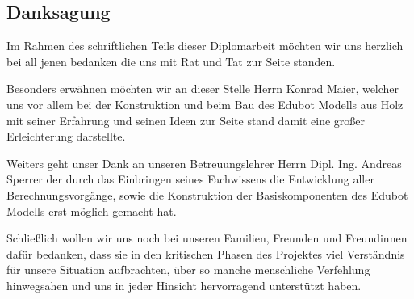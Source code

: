 \subsection{Danksagung}
Im Rahmen des schriftlichen Teils dieser Diplomarbeit möchten wir uns herzlich bei all jenen bedanken die uns mit Rat und Tat zur Seite standen.

Besonders erwähnen möchten wir an dieser Stelle Herrn Konrad Maier, welcher uns vor allem bei der Konstruktion und beim Bau des Edubot Modells aus Holz mit seiner Erfahrung und seinen Ideen zur Seite stand damit eine großer Erleichterung darstellte.

Weiters geht unser Dank an unseren Betreuungslehrer Herrn Dipl. Ing. Andreas Sperrer der durch das Einbringen seines Fachwissens die Entwicklung aller Berechnungsvorgänge, sowie die Konstruktion der Basiskomponenten des Edubot Modells erst möglich gemacht hat.

Schließlich wollen wir uns noch bei unseren Familien, Freunden und Freundinnen dafür bedanken, dass sie in den kritischen Phasen des Projektes viel Verständnis für unsere Situation aufbrachten, über so manche menschliche Verfehlung hinwegsahen und uns in jeder Hinsicht hervorragend unterstützt haben. 

